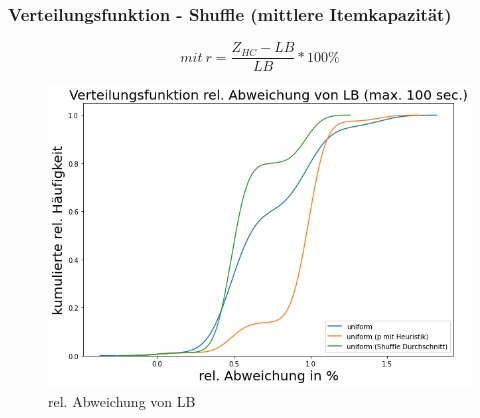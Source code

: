 \documentclass{beamer}
\begin{document}
\begin{frame}

\frametitle{Verteilungsfunktion - Shuffle (mittlere Itemkapazität)}

\begin{footnotesize}
\begin{equation}
mit \ r = \frac{Z_{HC}-LB}{LB} * 100\%
\end{equation}
\end{footnotesize}

\begin{figure}[!htbp]
\begin{center}
\includegraphics[scale=0.3]{img/dist5.png}
\end{center}
\caption{rel. Abweichung von LB}
\label{fig:architecture}
\end{figure}



\end{frame}
\end{document}
